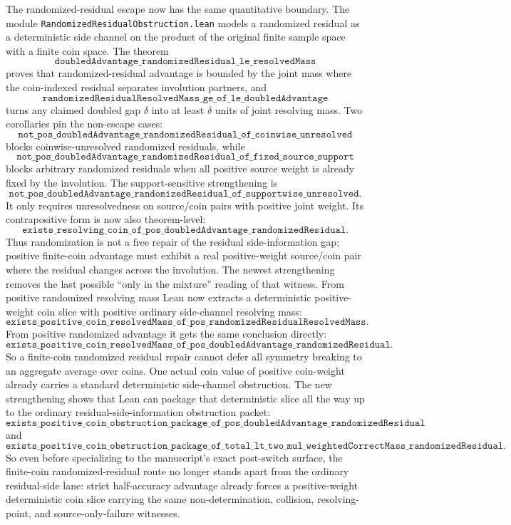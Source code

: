 \documentclass[11pt]{article}
\theoremstyle{remark}
\begin{document}
The randomized-residual escape now has the same quantitative boundary.  The module
\texttt{RandomizedResidualObstruction.lean} models a randomized residual as a deterministic side
channel on the product of the original finite sample space with a finite coin space.  The theorem
\[
  \texttt{doubledAdvantage\_randomizedResidual\_le\_resolvedMass}
\]
proves that randomized-residual advantage is bounded by the joint mass where the coin-indexed
residual separates involution partners, and
\[
  \texttt{randomizedResidualResolvedMass\_ge\_of\_le\_doubledAdvantage}
\]
turns any claimed doubled gap \(\delta\) into at least \(\delta\) units of joint resolving mass.
Two corollaries pin the non-escape cases:
\[
  \texttt{not\_pos\_doubledAdvantage\_randomizedResidual\_of\_coinwise\_unresolved}
\]
blocks coinwise-unresolved randomized residuals, while
\[
  \texttt{not\_pos\_doubledAdvantage\_randomizedResidual\_of\_fixed\_source\_support}
\]
blocks arbitrary randomized residuals when all positive source weight is already fixed by the
involution.  The support-sensitive strengthening is
\[
  \texttt{not\_pos\_doubledAdvantage\_randomizedResidual\_of\_supportwise\_unresolved}.
\]
It only requires unresolvedness on source/coin pairs with positive joint weight.  Its contrapositive
form is now also theorem-level:
\[
  \texttt{exists\_resolving\_coin\_of\_pos\_doubledAdvantage\_randomizedResidual}.
\]
Thus randomization is not a free repair of the residual side-information gap; positive finite-coin
advantage must exhibit a real positive-weight source/coin pair where the residual changes across
the involution.
The newest strengthening removes the last possible ``only in the mixture''
reading of that witness.  From positive randomized resolving mass Lean now
extracts a deterministic positive-weight coin slice with positive ordinary
side-channel resolving mass:
\[
  \texttt{exists\_positive\_coin\_resolvedMass\_of\_pos\_randomizedResidualResolvedMass}.
\]
From positive randomized advantage it gets the same conclusion directly:
\[
  \texttt{exists\_positive\_coin\_resolvedMass\_of\_pos\_doubledAdvantage\_randomizedResidual}.
\]
So a finite-coin randomized residual repair cannot defer all symmetry breaking
to an aggregate average over coins.  One actual coin value of positive
coin-weight already carries a standard deterministic side-channel obstruction.
The new strengthening shows that Lean can package that deterministic slice all
the way up to the ordinary residual-side-information obstruction packet:
\[
  \texttt{exists\_positive\_coin\_obstruction\_package\_of\_pos\_doubledAdvantage\_randomizedResidual}
\]
and
\[
  \texttt{exists\_positive\_coin\_obstruction\_package\_of\_total\_lt\_two\_mul\_weightedCorrectMass\_randomizedResidual}.
\]
So even before specializing to the manuscript's exact post-switch surface, the
finite-coin randomized-residual route no longer stands apart from the ordinary
residual-side lane: strict half-accuracy advantage already forces a
positive-weight deterministic coin slice carrying the same non-determination,
collision, resolving-point, and source-only-failure witnesses.
\end{document}
